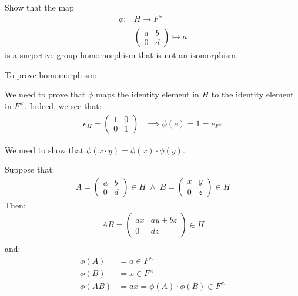 \begin{problem}
\begin{enumalph}
    \newpage
    \item Show that the map 
    \begin{align*}
      \phi \colon &H \to F^\times \\
                  &\begin{pmatrix} a & b \\ 0 & d \end{pmatrix} \mapsto a 
    \end{align*}
    is a surjective group homomorphism that is not an isomorphism.
    \begin{Answer}

      To prove homomorphism:
      \begin{enumalph}
        \item We need to prove that $\phi$ maps the identity element in $H$
         to the identity element in $F^\times$. Indeed, we see that:
         \begin{align*}
            e_H =
              \begin{pmatrix}
                1 & 0 \\
                0 & 1
              \end{pmatrix}
              &\implies
            \phi(e) = 1 = e_{F^\times}
         \end{align*}
        
        \item We need to show that $\phi(x \cdot y) = \phi(x) \cdot \phi(y)$.
        
        \noindent
         Suppose that:
          \begin{align*}
              A = \begin{pmatrix} a & b \\ 0 & d \end{pmatrix} \in H
              \; \land \;
              B = \begin{pmatrix} x & y \\ 0 & z \end{pmatrix} \in H
          \end{align*}
          Then:
          \begin{align*}
            AB = \begin{pmatrix} ax & ay + bz \\ 0 & dz \end{pmatrix} \in H \\
          \end{align*}
          and:
          \begin{align*}
            \phi(A) &= a \in F^\times \\
            \phi(B) &= x \in F^\times \\
            \phi(AB) &= ax = \phi(A) \cdot \phi(B) \in F^\times \\
          \end{align*}        
      \end{enumalph}


\end{Answer}
\end{enumalph}
\end{problem}
